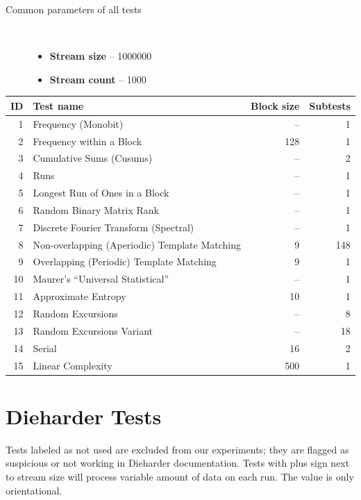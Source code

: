 \documentclass[
  digital,  	%
  color,		%
  oneside,   	%
  12pt,
  nocover,
  notable,
  nolof,
  nolot,
]{fithesis3}
\newenvironment{titlemize}[1]
{
	\begin{description}
	\item[#1]\
	\begin{itemize}
}
{
	\end{itemize}
 	\end{description}
}
\begin{document}
\begin{titlemize}{Common parameters of all tests}
\item \textbf{Stream size} -- 1000000
\item \textbf{Stream count} -- 1000
\end{titlemize}

\begin{nomar}
\centering
\begin{tabular}{ r | l | r | r }
\textbf{ID} & \textbf{Test name} & \textbf{Block size} & \textbf{Subtests} \\ \hline \hline
1  & Frequency (Monobit)                           & --  & 1 \\
2  & Frequency within a Block                      & 128 & 1 \\
3  & Cumulative Sums (Cusums)	                   & --  & 2 \\
4  & Runs                                          & --  & 1 \\
5  & Longest Run of Ones in a Block                & --  & 1 \\
6  & Random Binary Matrix Rank                     & --  & 1 \\
7  & Discrete Fourier Transform (Spectral)         & --  & 1 \\
8  & Non-overlapping (Aperiodic) Template Matching & 9   & 148 \\
9  & Overlapping (Periodic) Template Matching      & 9   & 1 \\
10 & Maurer's “Universal Statistical” 	           & --  & 1 \\
11 & Approximate Entropy 	                       & 10  & 1 \\
12 & Random Excursions 	                           & --  & 8 \\
13 & Random Excursions Variant	                   & --  & 18 \\
14 & Serial                                        & 16  & 2 \\
15 & Linear Complexity	                           & 500 & 1 \\
\end{tabular}
\end{nomar}

\chapter{Dieharder Tests}
\label{app:dieharder_tests}
Tests labeled as not used are excluded from our experiments; they are flagged as suspicious or not working in Dieharder documentation. Tests with plus sign next to stream size will process variable amount of data on each run. The value is only orientational.
\end{document}
